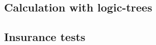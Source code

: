 \subsection{Calculation with logic-trees}
\label{subsec:acc-ebr-logictrees}


\subsection{Insurance tests}
\label{subsec:acc-ebr-insurance}

